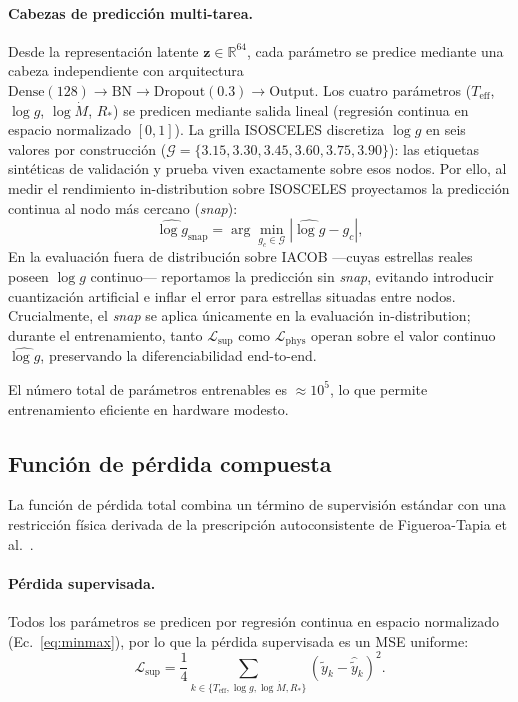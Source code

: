 \documentclass[sigconf,ACM]{acmart}
\begin{document}
\paragraph{Cabezas de predicción multi-tarea.} Desde la representación latente $\mathbf{z} \in \mathbb{R}^{64}$, cada parámetro se predice mediante una cabeza independiente con arquitectura $\mathrm{Dense}(128) \rightarrow \mathrm{BN} \rightarrow \mathrm{Dropout}(0.3) \rightarrow \mathrm{Output}$. Los cuatro parámetros ($T_{\mathrm{eff}}$, $\log g$, $\log \dot{M}$, $R_{*}$) se predicen mediante salida lineal (regresión continua en espacio normalizado $[0,1]$). La grilla ISOSCELES discretiza $\log g$ en seis valores por construcción ($\mathcal{G} = \{3.15, 3.30, 3.45, 3.60, 3.75, 3.90\}$): las etiquetas sintéticas de validación y prueba viven exactamente sobre esos nodos. Por ello, al medir el rendimiento in-distribution sobre ISOSCELES proyectamos la predicción continua al nodo más cercano (\emph{snap}):
\begin{equation}
  \widehat{\log g}_{\mathrm{snap}} = \arg\min_{g_c \in \mathcal{G}} \left| \widehat{\log g} - g_c \right|,
  \label{eq:logg_snap}
\end{equation}
En la evaluación fuera de distribución sobre IACOB ---cuyas estrellas reales poseen $\log g$ continuo--- reportamos la predicción sin \emph{snap}, evitando introducir cuantización artificial e inflar el error para estrellas situadas entre nodos. Crucialmente, el \emph{snap} se aplica únicamente en la evaluación in-distribution; durante el entrenamiento, tanto $\mathcal{L}_{\mathrm{sup}}$ como $\mathcal{L}_{\mathrm{phys}}$ operan sobre el valor continuo $\widehat{\log g}$, preservando la diferenciabilidad end-to-end.

El número total de parámetros entrenables es $\approx 10^5$, lo que permite entrenamiento eficiente en hardware modesto.

\subsection{Función de pérdida compuesta}
\label{subsec:loss}

La función de pérdida total combina un término de supervisión estándar con una restricción física derivada de la prescripción autoconsistente de Figueroa-Tapia et al.~\cite{FigueroaTapia2026}.

\paragraph{Pérdida supervisada.} Todos los parámetros se predicen por regresión continua en espacio normalizado (Ec.~\ref{eq:minmax}), por lo que la pérdida supervisada es un MSE uniforme:
\begin{equation}
  \mathcal{L}_{\mathrm{sup}} = \frac{1}{4}\sum_{k \in \{T_{\mathrm{eff}}, \log g, \log \dot{M}, R_{*}\}} \left(\tilde{y}_k - \hat{\tilde{y}}_k\right)^2.
  \label{eq:l_sup}
\end{equation}
\end{document}
